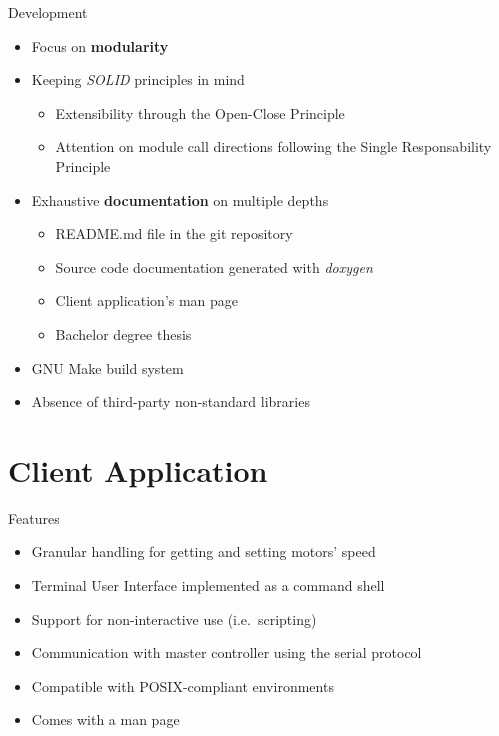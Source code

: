 \documentclass{beamer}
\begin{document}
\begin{frame}{Development}
\begin{itemize}
  \item Focus on \textbf{modularity}
  \item Keeping \emph{SOLID} principles in mind
  \begin{itemize}
    \item Extensibility through the Open-Close Principle
    \item Attention on module call directions following the Single
      Responsability Principle
  \end{itemize}
  \item Exhaustive \textbf{documentation} on multiple depths
  \begin{itemize}
    \item README.md file in the git repository
    \item Source code documentation generated with \emph{doxygen}
    \item Client application's man page
    \item Bachelor degree thesis
  \end{itemize}
  \item GNU Make build system
  \item Absence of third-party non-standard libraries
\end{itemize}
\end{frame}

\hypertarget{client-application}{%
\section{Client Application}\label{client-application}}

\begin{frame}{Features}
\begin{itemize}
  \item Granular handling for getting and setting motors' speed
  \item Terminal User Interface implemented as a command shell
  \item Support for non-interactive use (i.e.~scripting)
  \item Communication with master controller using the serial protocol
  \item Compatible with POSIX-compliant environments
  \item Comes with a man page
\end{itemize}
\end{frame}
\end{document}
